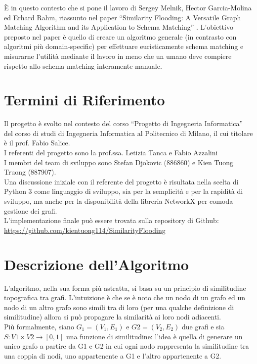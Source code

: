 \documentclass{article}
\begin{document}
È in questo contesto che si pone il lavoro di Sergey Melnik, Hector Garcia-Molina ed Erhard Rahm, riassunto nel paper “Similarity Flooding: A Versatile Graph Matching Algorithm
and its Application to Schema Matching” \cite{sfpaper}. L’obiettivo preposto nel paper è quello di creare un algoritmo generale (in contrasto con algoritmi più domain-specific) per effettuare euristicamente schema matching e misurarne l’utilità mediante il lavoro in meno che un umano deve compiere rispetto allo schema matching interamente manuale.


\section{Termini di Riferimento}

Il progetto è svolto nel contesto del corso “Progetto di Ingegneria Informatica” del corso di studi di Ingegneria Informatica al Politecnico di Milano, il cui titolare è il prof. Fabio Salice.\\

I referenti del progetto sono la prof.ssa. Letizia Tanca e Fabio Azzalini\\

I membri del team di sviluppo sono Stefan Djokovic (886860) e Kien Tuong Truong (887907).\\

Una discussione iniziale con il referente del progetto è risultata nella scelta di Python 3 come linguaggio di sviluppo, sia per la semplicità e per la rapidità di sviluppo, ma anche per la disponibilità della libreria NetworkX per comoda gestione dei grafi.\\

L’implementazione finale può essere trovata sulla repository di Github:\\
\url{https://github.com/kientuong114/SimilarityFlooding}


\section{Descrizione dell'Algoritmo}

L’algoritmo, nella sua forma più astratta, si basa su un principio di similitudine topografica tra grafi. L’intuizione è che se è noto che un nodo di un grafo ed un nodo di un altro grafo sono simili tra di loro (per una qualche definizione di similitudine) allora si può propagare la similarità ai loro nodi adiacenti.\\
Più formalmente, siano $G_1 = (V_1, E_1)$ e $G2 = (V_2, E_2) $ due grafi e sia \\ $S: V1\times V2 \to [0, 1]$ una funzione di similitudine: l’idea è quella di generare un unico grafo a partire da G1 e G2 in cui ogni nodo rappresenta la similitudine tra una coppia di nodi, uno appartenente a G1 e l’altro appartenente a G2.\\
\end{document}
